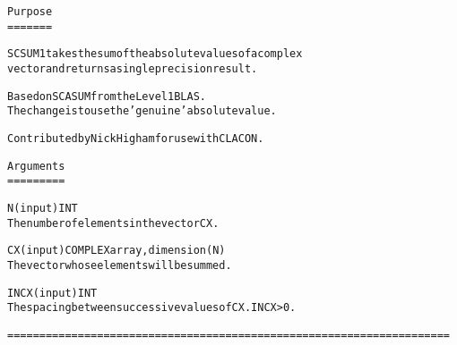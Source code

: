 \small\begin{alltt}
    Purpose   
    =======\end{alltt}\normalsize 


\small\begin{alltt}    SCSUM1 takes the sum of the absolute values of a complex   
    vector and returns a single precision result.\end{alltt}\normalsize 


\small\begin{alltt}    Based on SCASUM from the Level 1 BLAS.   
    The change is to use the 'genuine' absolute value.\end{alltt}\normalsize 


\small\begin{alltt}    Contributed by Nick Higham for use with CLACON.\end{alltt}\normalsize 


\small\begin{alltt}    Arguments   
    =========\end{alltt}\normalsize 


\small\begin{alltt}    N       (input) INT
            The number of elements in the vector CX.\end{alltt}\normalsize 


\small\begin{alltt}    CX      (input) COMPLEX array, dimension (N)   
            The vector whose elements will be summed.\end{alltt}\normalsize 


\small\begin{alltt}    INCX    (input) INT
            The spacing between successive values of CX.  INCX > 0.\end{alltt}\normalsize 


\small\begin{alltt}    ===================================================================== 
\end{alltt}\normalsize 
 